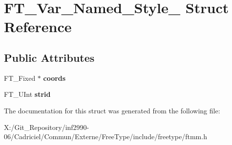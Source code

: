 \hypertarget{struct_f_t___var___named___style__}{\section{F\-T\-\_\-\-Var\-\_\-\-Named\-\_\-\-Style\-\_\- Struct Reference}
\label{struct_f_t___var___named___style__}
}
\subsection*{Public Attributes}
\begin{DoxyCompactItemize}
\item 
\hypertarget{struct_f_t___var___named___style___a07195d55aee541db651ef3a8b04bb41f}{F\-T\-\_\-\-Fixed $\ast$ {\bfseries coords}}\label{struct_f_t___var___named___style___a07195d55aee541db651ef3a8b04bb41f}

\item 
\hypertarget{struct_f_t___var___named___style___a7802f6958c6e883bdce16b9931002826}{F\-T\-\_\-\-U\-Int {\bfseries strid}}\label{struct_f_t___var___named___style___a7802f6958c6e883bdce16b9931002826}

\end{DoxyCompactItemize}


The documentation for this struct was generated from the following file\-:\begin{DoxyCompactItemize}
\item 
X\-:/\-Git\-\_\-\-Repository/inf2990-\/06/\-Cadriciel/\-Commun/\-Externe/\-Free\-Type/include/freetype/ftmm.\-h\end{DoxyCompactItemize}
